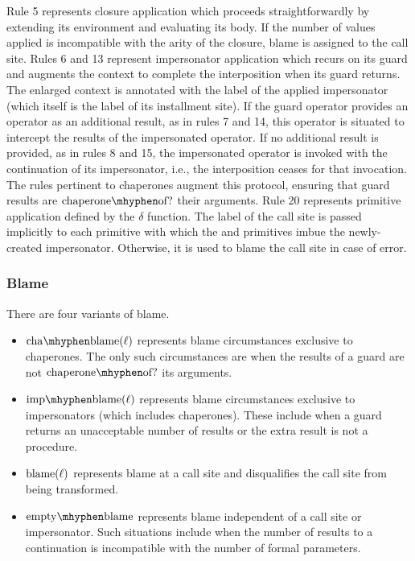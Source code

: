 Rule 5 represents closure application which proceeds straightforwardly by extending its environment and evaluating its body.
If the number of values applied is incompatible with the arity of the closure, blame is assigned to the call site.
Rules 6 and 13 represent impersonator application which recurs on its guard and augments the context to complete the interposition when its guard returns.
The enlarged context is annotated with the label of the applied impersonator (which itself is the label of its installment site).
If the guard operator provides an operator as an additional result, as in rules 7 and 14, this operator is situated to intercept the results of the impersonated operator.
If no additional result is provided, as in rules 8 and 15, the impersonated operator is invoked with the continuation of its impersonator, i.e., the interposition ceases for that invocation.
The rules pertinent to chaperones augment this protocol, ensuring that guard results are $\mathrm{chaperone\mhyphen of?}$ their arguments.
Rule 20 represents primitive application defined by the $\delta$ function.
The label of the call site is passed implicitly to each primitive with which the  and  primitives imbue the newly-created impersonator.
Otherwise, it is used to blame the call site in case of error.

\subsubsection{Blame}

There are four variants of blame.
\begin{itemize}
\item
$\chablame{\ell}$ represents blame circumstances exclusive to chaperones.
The only such circumstances are when the results of a guard are not $\mathrm{chaperone\mhyphen of?}$ its arguments.

\item
$\impblame{\ell}$ represents blame circumstances exclusive to impersonators (which includes chaperones).
These include when a guard returns an unacceptable number of results or the extra result is not a procedure.

\item
$\mathrm{blame}(\ell)$ represents blame at a call site and disqualifies the call site from being transformed.

\item
$\noblame$ represents blame independent of a call site or impersonator.
Such situations include when the number of results to a  continuation is incompatible with the number of formal parameters.
\end{itemize}

